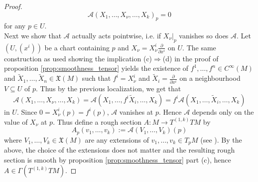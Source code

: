 \begin{proof}
\begin{equation*}
\mathcal{A}(X_1,\dots,X_\nu,\dots,X_k)_p = 0
\end{equation*}
\noindent for any $p \in U$.\\
Next we show that $\mathcal{A}$ actually acts pointwise, i.e. if $X_\nu\vert_p$ vanishes so does $\mathcal{A}$. Let $(U,(x^i))$ be a chart containing $p$ and $X_\nu = X_\nu^i \frac{\partial}{\partial x^i}$ on $U$. The same construction as used showing the implication (c)$\Rightarrow$(d) in the proof of proposition \ref{prop:smoothness_tensor} yields the existence of $f^1,\dots,f^n \in C^\infty(M)$ and $\widetilde{X}_1,\dots,\widetilde{X}_n \in \mathfrak{X}(M)$ such that $f^i = X_\nu^i$ and $\widetilde{X}_i = \frac{\partial}{\partial x^i}$ on a neighbourhood $V \subseteq U$ of $p$. Thus by the previous localization, we get that 
\begin{equation*}
\mathcal{A}(X_1,\dots,X_\nu,\dots,X_k) = \mathcal{A}(X_1,\dots,f^i\widetilde{X}_i,\dots,X_k) = f^i\mathcal{A}(X_1,\dots,\widetilde{X}_i,\dots,X_k) 
\end{equation*} 
\noindent in $U$. Since $0 = X_\nu^i(p) = f^i(p)$, $\mathcal{A}$ vanishes at $p$. Hence $\mathcal{A}$ depends only on the value of $X_\nu$ at $p$. Thus define a rough section $A : M \to T^{(1,k)}TM$ by 
\begin{equation*}
A_p(v_1,\dots,v_k) := \mathcal{A}(V_1,\dots,V_k)(p)
\end{equation*}
\noindent where $V_1,\dots,V_k \in \mathfrak{X}(M)$ are any extensions of $v_1,\dots,v_k \in T_pM$ (see \cite[177]{lee:smooth_manifolds:2013}). By the above, the choice of the extensions does not matter and the resulting rough section is smooth by proposition \ref{prop:smoothness_tensor} part (c), hence $A \in \Gamma(T^{(1,k)}TM)$.
\end{proof}

